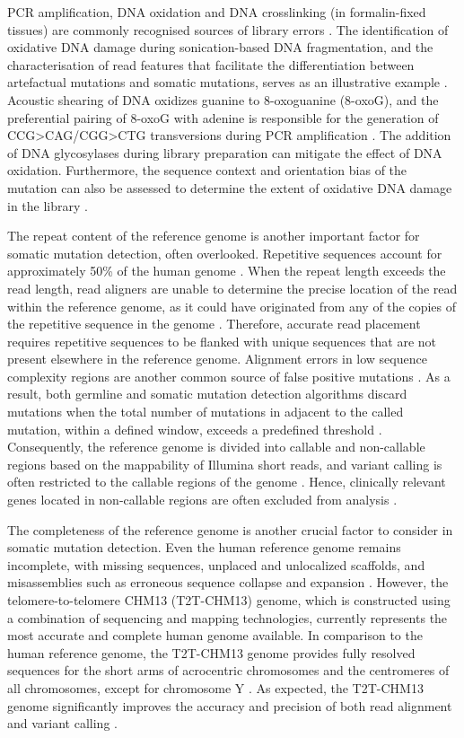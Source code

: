 PCR amplification, DNA oxidation and DNA crosslinking (in formalin-fixed tissues) are commonly recognised sources of library errors \cite{Chen2017-ba}. The identification of oxidative DNA damage during sonication-based DNA fragmentation, and the characterisation of read features that facilitate the differentiation between artefactual mutations and somatic mutations, serves as an illustrative example \cite{Costello2013-cz}. Acoustic shearing of DNA oxidizes guanine to 8-oxoguanine (8-oxoG), and the preferential pairing of 8-oxoG with adenine \cite{Shibutani1991-tw} is responsible for the generation of CCG>CAG/CGG>CTG transversions during PCR amplification \cite{Costello2013-cz}. The addition of DNA glycosylases during library preparation can mitigate the effect of DNA oxidation. Furthermore, the sequence context and orientation bias of the mutation can also be assessed to determine the extent of oxidative DNA damage in the library \cite{Costello2013-cz}.


The repeat content of the reference genome is another important factor for somatic mutation detection, often overlooked. Repetitive sequences account for approximately 50\% of the human genome \cite{Lander2001-du}. When the repeat length exceeds the read length, read aligners are unable to determine the precise location of the read within the reference genome, as it could have originated from any of the copies of the repetitive sequence in the genome \cite{Li2008-dt}. Therefore, accurate read placement requires repetitive sequences to be flanked with unique sequences that are not present elsewhere in the reference genome. Alignment errors in low sequence complexity regions are another common source of false positive mutations \cite{Li2014-ra}. As a result, both germline and somatic mutation detection algorithms discard mutations when the total number of mutations in adjacent to the called mutation, within a defined window, exceeds a predefined threshold \cite{Cibulskis2013-gw, DePristo2011-vf}. Consequently, the reference genome is divided into callable and non-callable regions based on the mappability of Illumina short reads, and variant calling is often restricted to the callable regions of the genome \cite{1000_Genomes_Project_Consortium2012-rj}. Hence, clinically relevant genes located in non-callable regions are often excluded from analysis \cite{Wagner2022-ph}.

The completeness of the reference genome is another crucial factor to consider in somatic mutation detection. Even the human reference genome remains incomplete, with missing sequences, unplaced and unlocalized scaffolds, and misassemblies such as erroneous sequence collapse and expansion \cite{Schneider2017-yo}. However, the telomere-to-telomere CHM13 (T2T-CHM13) genome, which is constructed using a combination of sequencing and mapping technologies, currently represents the most accurate and complete human genome available. In comparison to the human reference genome, the T2T-CHM13 genome provides fully resolved sequences for the short arms of acrocentric chromosomes and the centromeres of all chromosomes, except for chromosome Y \cite{Nurk2022-dv}. As expected, the T2T-CHM13 genome significantly improves the accuracy and precision of both read alignment and variant calling \cite{Aganezov2022-dv}.


